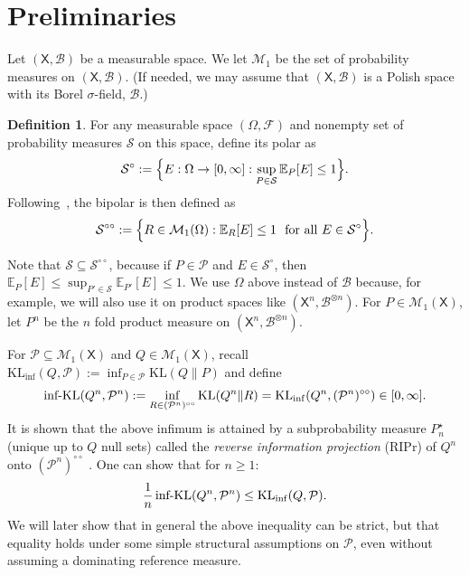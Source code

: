 \documentclass[11pt]{article}
\newcommand{\KL}{\mathrm{KL}}
\newcommand{\KLinf}{\mathrm{KL}_{\mathrm{inf}}}
\newcommand{\infKL}{\textnormal{inf-KL}}
\newcommand{\E}{\mathbb{E}}
\newcommand{\Pcal}{\mathcal{P}}
\newcommand{\X}{\mathsf{X}}
\newcommand{\B}{\mathcal{B}}
\theoremstyle{definition}
\newtheorem{definition}[theorem]{Definition}
\theoremstyle{definition}
\begin{document}
\section{Preliminaries}\label{sec:warmup}
Let $(\X, \B)$ be a measurable space.
We let $\mathcal{M}_1$ be the set of probability measures on $(\X,\B)$. (If needed, we may assume that $(\X, \B)$ is a Polish space with its Borel $\sigma$-field, $\B$.)

\begin{definition}\label{def:bipolar}
For any measurable space $(\Omega, \mathcal{F})$ and nonempty set of probability measures $\mathcal{S}$ on this space, 
define its polar as
\[
\mathcal{S}^{\circ}:=\Bigl\{E:\Omega\to[0,\infty]:\sup_{P\in\mathcal{S}} \E_P[E] \le 1\Bigr\}.
\]
Following~\cite{larsson2025numeraire}, the bipolar is then defined as
\[
\mathcal{S}^{\circ\circ} := \Bigl\{R\in\mathcal{M}_1(\Omega): \E_R[E] \le 1\ \text{ for all }E\in\mathcal{S}^{\circ} \Bigr\}.
\]
\end{definition}

\noindent Note that $\mathcal S\subseteq \mathcal S^{\circ\circ}$, because if $P\in\mathcal P$ and $E\in\mathcal S^{\circ}$, then $\E_P[E]\le \sup_{P'\in\mathcal S}\E_{P'}[E]\le 1$. 
We use $\Omega$ above instead of $\B$ because, for example, we will also use it on product spaces like $(\X^n, \B^{\otimes n})$. For $P \in \mathcal{M}_1(\X)$, let $P^n$ be the $n$ fold product measure on $(\X^n, \B^{\otimes n})$.

For $\Pcal \subseteq \mathcal{M}_1(\X)$ and $Q \in \mathcal{M}_1(\X)$, 
recall  $\KLinf(Q,\Pcal):=\inf_{P\in\Pcal}\KL(Q\|P)$ and 
define
\[
\infKL(Q^n,\Pcal^n):=\inf_{R\in(\Pcal^n)^{\circ\circ}} \KL(Q^n\|R)=\KLinf(Q^n,(\Pcal^n)^{\circ\circ})\in[0,\infty].
\]
It is shown that the above infimum is attained by a subprobability measure $P_n^\star$ (unique up to $Q$ null sets) called the \emph{reverse information projection} (RIPr) of $Q^n$ onto $(\Pcal^n)^{\circ\circ}$ \parencite{larsson2025numeraire}. 
One can show that for $n \geq 1$:
\[
\frac{1}{n}\,\infKL(Q^n,\Pcal^n) \leq \KL_{\inf}(Q,\Pcal).
\]
We will later show that in general the above inequality can be strict, but that equality holds under some simple structural assumptions on $\Pcal$, even without assuming a dominating reference measure. 
\end{document}
